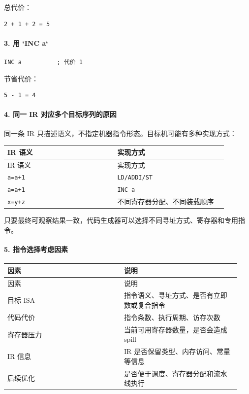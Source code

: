 \documentclass[UTF8]{ctexart}
\begin{document}
总代价：

\begin{Verbatim}[fontsize=\small,breaklines=true]
2 + 1 + 2 = 5
\end{Verbatim}

\paragraph*{3. 用 `INC a`}

\begin{Verbatim}[fontsize=\small,breaklines=true]
INC a          ; 代价 1
\end{Verbatim}

节省代价：

\begin{Verbatim}[fontsize=\small,breaklines=true]
5 - 1 = 4
\end{Verbatim}

\paragraph*{4. 同一 IR 对应多个目标序列的原因}

同一条 IR 只描述语义，不指定机器指令形态。目标机可能有多种实现方式：

\begin{longtable}{|p{0.47\linewidth}|p{0.47\linewidth}|}
\hline
IR 语义 & 实现方式 \\
\hline
\endfirsthead
IR 语义 & 实现方式 \\
\hline
\endhead
\texttt{a=a+1} & \texttt{LD/ADDI/ST} \\
\hline
\texttt{a=a+1} & \texttt{INC a} \\
\hline
\texttt{x=y+z} & 不同寄存器分配、不同装载顺序 \\
\hline
\end{longtable}

只要最终可观察结果一致，代码生成器可以选择不同寻址方式、寄存器和专用指令。

\paragraph*{5. 指令选择考虑因素}

\begin{longtable}{|p{0.47\linewidth}|p{0.47\linewidth}|}
\hline
因素 & 说明 \\
\hline
\endfirsthead
因素 & 说明 \\
\hline
\endhead
目标 ISA & 指令语义、寻址方式、是否有立即数或复合指令 \\
\hline
代码代价 & 指令条数、执行周期、访存次数 \\
\hline
寄存器压力 & 当前可用寄存器数量，是否会造成 spill \\
\hline
IR 信息 & IR 是否保留类型、内存访问、常量等信息 \\
\hline
后续优化 & 是否便于调度、寄存器分配和流水线执行 \\
\hline
\end{longtable}
\end{document}
